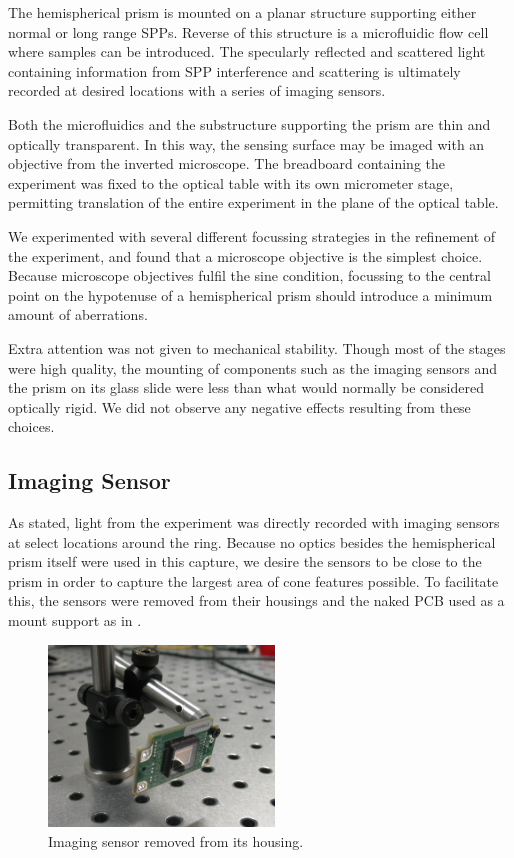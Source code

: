 The hemispherical prism is mounted on a planar structure supporting either
normal or long range SPPs.  Reverse of this structure is a microfluidic
flow cell where samples can be introduced.  The specularly reflected and
scattered light containing information from SPP interference and scattering
is ultimately recorded at desired locations with a series of imaging
sensors.

Both the microfluidics and the substructure supporting the prism are thin
and optically transparent.  In this way, the sensing surface may be imaged
with an objective from the inverted microscope.  The breadboard containing
the experiment was fixed to the optical table with its own micrometer
stage, permitting translation of the entire experiment in the plane of the
optical table.

We experimented with several different focussing strategies in the
refinement of the experiment, and found that a microscope objective is the
simplest choice.  Because microscope objectives fulfil the sine condition,
focussing to the central point on the hypotenuse of a hemispherical prism
should introduce a minimum amount of aberrations.

Extra attention was not given to mechanical stability.  Though most of the
stages were high quality, the mounting of components such as the imaging
sensors and the prism on its glass slide were less than what would normally be considered optically rigid.
We did not observe any negative effects resulting from these choices.

\subsection{Imaging Sensor}
As stated, light from the experiment was directly recorded with imaging
sensors at select locations around the ring.  Because no optics besides the
hemispherical prism itself were used in this capture, we desire the sensors
to be close to the prism in order to capture the largest area of cone
features possible.  To facilitate this, the sensors were removed from their
housings and the naked PCB used as a mount support as in
.
\begin{figure}[ht]
 \centering
 \includegraphics[width=6cm,keepaspectratio]{experimental/figures/nakedsensorcrop.jpg}
 \caption{Imaging sensor removed from its housing.}
 \label{fig:imagingsensor}
\end{figure}

